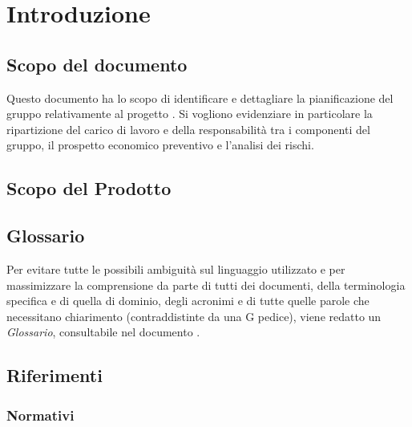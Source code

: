 \section{Introduzione}

\subsection{Scopo del documento}
Questo documento ha lo scopo di identificare e dettagliare la pianificazione del gruppo \GroupName{} relativamente al progetto \ProjectName{}. Si vogliono evidenziare in particolare la ripartizione del carico di lavoro e della responsabilità tra i componenti del gruppo, il prospetto economico preventivo e l'analisi dei rischi.

\subsection{Scopo del Prodotto}
\ScopoDelProdotto

\subsection{Glossario}
Per evitare tutte le possibili ambiguità sul linguaggio utilizzato e per massimizzare la comprensione da parte di tutti dei documenti, della terminologia specifica e di quella di dominio, degli acronimi e di tutte quelle parole che necessitano chiarimento (contraddistinte da una G pedice), viene redatto un \textit{Glossario}, consultabile nel documento \Glossario.

\subsection{Riferimenti}
\subsubsection{Normativi}


